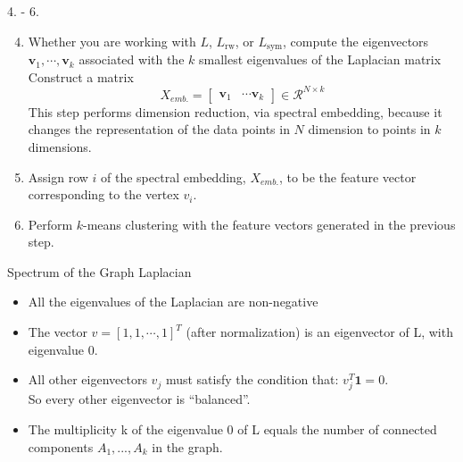 \documentclass{beamer}
\begin{document}
\begin{frame}{4. - 6.}
    \begin{enumerate}
     \setcounter{enumi}{3}
        \item Whether you are working with $L$, $L_{\textrm{rw}}$, or $L_{\textrm{sym}}$, compute the eigenvectors
        $
        \mathbf{v}_1, \cdots, \mathbf{v}_k
        $
        associated with the $k$ smallest eigenvalues of the Laplacian matrix \\
        Construct a matrix
        $$ X_{emb.} = 
        \begin{bmatrix}
            \mathbf{v}_1 & \cdots \mathbf{v}_k
        \end{bmatrix} \in \mathcal{R}^{N \times k}
        $$
        This step performs dimension reduction, via spectral embedding, because it changes the representation of the data points in $N$ dimension to points in $k$ dimensions.
    \item Assign row $i$ of the spectral embedding, $X_{emb.}$, to be the feature vector corresponding to the vertex $v_i$.
    \item Perform $k$-means clustering with the feature vectors generated in the previous step. \\
    \end{enumerate}
\end{frame}
\begin{frame}{Spectrum of the Graph Laplacian}
\begin{itemize}
    \item All the eigenvalues of the Laplacian are non-negative
    \item The vector $v=[1,1,\cdots, 1]^T$ (after normalization) is an eigenvector of L, with eigenvalue 0. 
    \item All other eigenvectors $v_j$ must satisfy the condition that:
$v_j^T\mathbf{1}=0$.\\
So every other eigenvector is “balanced”.
\item The multiplicity k of the eigenvalue 0 of L equals the number of connected components $A_1, . . .,A_k$ in the graph.
\end{itemize}
\end{frame}
\end{document}
